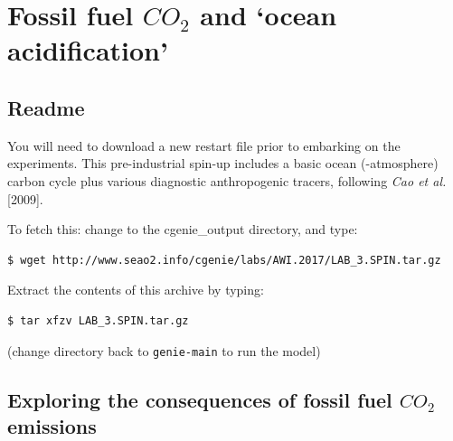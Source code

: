 \documentclass[11pt,fleqn]{book} %
\begin{document}

\cleardoublepage


\chapter{Fossil fuel \(CO_{2}\) and ‘ocean acidification’}

\hfill \break


\newpage


\section*{Readme}

You will need to download a new restart file prior to embarking on the experiments. This pre-industrial spin-up includes a basic ocean (-atmosphere) carbon cycle plus various diagnostic anthropogenic tracers, following \textit{Cao et al.} [2009].

\noindent To fetch this: change to the cgenie\_output directory, and type:

\begin{verbatim}
$ wget http://www.seao2.info/cgenie/labs/AWI.2017/LAB_3.SPIN.tar.gz
\end{verbatim}

\noindent Extract the contents of this archive by typing:

\begin{verbatim}
$ tar xfzv LAB_3.SPIN.tar.gz 
\end{verbatim}

\noindent (change directory back to \texttt{genie-main} to run the model)


\newpage


\section{Exploring the consequences of fossil fuel \(CO_{2}\) emissions}
\end{document}
